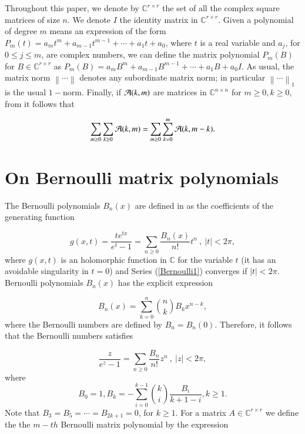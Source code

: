 \documentclass[preprint,10pt]{elsarticle}
\begin{document}
 Throughout this paper, we denote by $\mathbb{C}^{r \times r}$ the set of all the complex square matrices of size $n$. We denote $I$ the identity matrix in $ \mathbb{C}^{r \times r}$. Given a polynomial of degree $m$ means an expression of the form $P_m(t)=a_{m} t^m+a_{m-1}t^{m-1}+\cdots+a_{1}t+a_{0}$, where $t$ is a real variable and $a_j$, for $0\leq j \leq m$, are complex numbers, we can define the matrix polynomial $P_m(B)$ for $B \in \mathbb{C}^{r \times r}$  as $P_m(B)=a_{m} B^m+a_{m-1}B^{m-1}+\cdots+a_{1}B+a_{0}I$.  As usual, the matrix norm $\left\|\cdots \right\|$ denotes any subordinate matrix norm; in particular $\left\| \cdots \right\|_{1}$ is the usual $1-$norm. Finally, if ${\cal A}(k, m)$ are matrices in $\mathbb{C}^{n \times n}$ for $m\geq 0, k \geq 0$, from \cite{rainville1960special} it follows that

\begin{equation}\label{rainville}
\sum_{m \geq 0} \sum_{k \geq 0} {\cal A}(k, m)=\sum_{m \geq 0} \sum_{k=0}^{m} {\cal A}(k, m-k).
\end{equation}

\section{On Bernoulli matrix polynomials}
The Bernoulli polynomials $B_n(x)$ are defined in \cite[p.588]{olver2010nist} as the coefficients of the generating function

\begin{equation}\label{Bernoulli1}
g(x, t)= \frac{t e^{tx}}{e^t-1}=\sum_{n \geq 0} \frac{B_n(x)}{n!}t^n  \ , \ |t|<2\pi,
\end{equation}
where $g(x, t)$ is an holomorphic function in $\mathbb{C}$ for the variable $t$ (it has an avoidable singularity in $t=0$) and  Series (\ref{Bernoulli1}) converges if $|t|<2\pi$. Bernoulli polynomials  $B_n(x)$ has the explicit expression

\begin{equation}\label{Bernoulli2}
B_n(x)=\sum_{k=0}^{n} {n \choose k} B_k x^{n-k},
\end{equation}
where the Bernoulli numbers are defined by $B_n=B_n(0)$. Therefore, it follows that the Bernoulli numbers satisfies

\begin{equation}\label{Bernoulli3}
\frac{z}{e^z-1}=\sum_{n \geq 0} \frac{B_n}{n!}z^n  \ , \ |z|<2\pi,
\end{equation}
where
\begin{equation}\label{Bernoulli3a}
B_0=1, \displaystyle  B_{k}= -\sum_{i=0}^{k-1} {k \choose i} \frac{B_i}{k+1-i}, k \geq 1.
\end{equation}
Note that $ B_{3}=B_{5}=\cdots=B_{2k+1}=0$, for
$k\geq 1$. For a matrix $A \in \mathbb{C}^{r \times r}$ we define the the $m-th$ Bernoulli matrix polynomial by the expression
\end{document}
